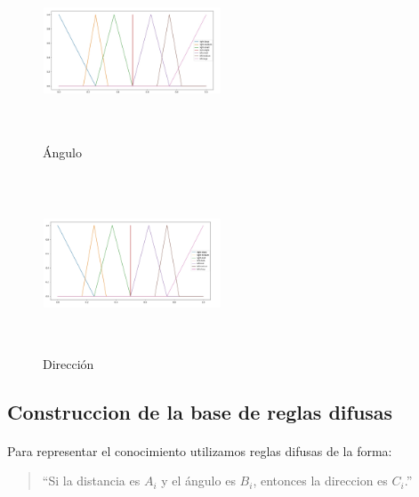 \documentclass[a4paper,10pt]{article}
\begin{document}
	\begin{figure}[htb]%
		\begin{center}
			\includegraphics[width=200px, height=200px]{images/angle_plot.jpg}
		\end{center}
		\caption{Ángulo \label{fig:angle_plot}}%
	\end{figure}
	
	\begin{figure}[htb]%
		\begin{center}
			\includegraphics[width=200px, height=200px]{images/direction_plot.jpg}
		\end{center}
		\caption{Dirección \label{fig:direction_plot}}%
	\end{figure}

\subsection{Construccion de la base de reglas difusas}\label{sub:fuzzy_rule_base}
	\paragraph{} Para representar el conocimiento  utilizamos reglas difusas de la forma:
	
	\begin{quote}
		``Si la distancia es $A_{i}$ y el ángulo es $B_{i}$, entonces la direccion es $C_{i}$.''
	\end{quote}
	
\end{document}
